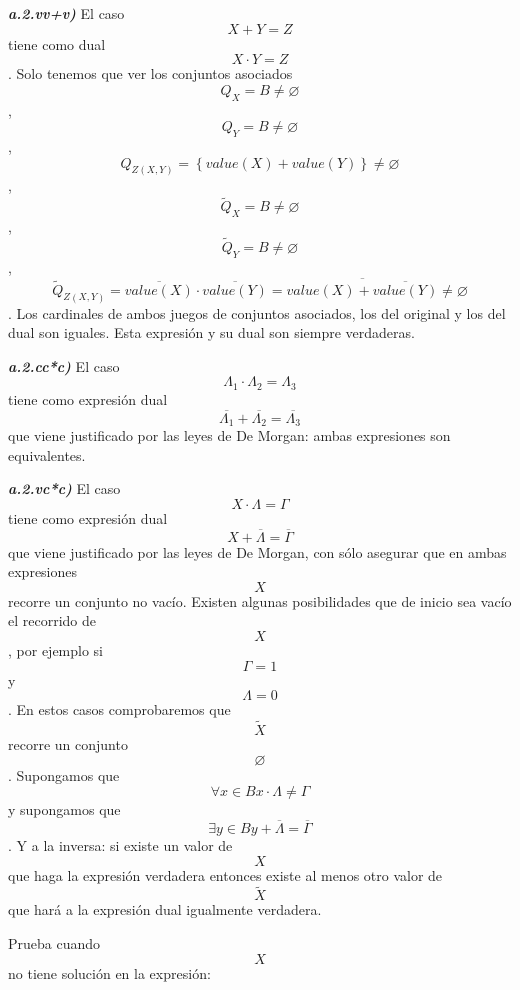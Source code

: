\begin{enumerate}
\begin{enumerate}
\begin{enumerate}
\begin{enumerate}
\begin{enumerate}
          \emph{\textbf{a.2.vv+v)}} El caso \[{X + Y} = Z\] tiene como
          dual \[{X \cdot Y} = Z\]. Solo tenemos que ver los conjuntos
          asociados \[{Q_{X} = B} \neq \varnothing\] ,
          \[{Q_{Y} = B} \neq \varnothing\] ,
          \[{Q_{Z{({X,Y})}} = \left\{ {{\mathit{value}{(X)}} + {\mathit{value}{(Y)}}} \right\}} \neq \varnothing\]
          , \[{{\widetilde{Q}}_{X} = B} \neq \varnothing\] ,
          \[{{\widetilde{Q}}_{Y} = B} \neq \varnothing\] ,
          \[{{{\widetilde{Q}}_{Z{({X,Y})}} = {\overline{\mathit{value}{(X)}} \cdot \overline{\mathit{value}{(Y)}}}} = \overline{{\mathit{value}{(X)}}+\overline{\mathit{value}{(Y)}}}} \neq \varnothing\]
          . Los cardinales de ambos jue\-gos de conjuntos asociados, los
          del original y los del dual son iguales. Esta expresión y su
          dual son siempre verdaderas.

          \emph{\textbf{a.2.cc*c)}} El caso
          \[{\Lambda_{1} \cdot \Lambda_{2}} = \Lambda_{3}\] tiene como
          expresión dual
          \[{\overline{\Lambda_{1}} + \overline{\Lambda_{2}}} = \overline{\Lambda_{3}}\]que
          viene justificado por las leyes de De Morgan: ambas
          expresiones son equivalentes.

          \emph{\textbf{a.2.vc*c)}} El caso
          \[{X \cdot \Lambda} = \Gamma\] tiene como expresión dual
          \[{X + \overline{\Lambda}} = \overline{\Gamma}\] que viene
          justificado por las leyes de De Morgan, con sólo asegurar que
          en am\-bas expresiones \[X\]recorre un conjunto no vacío.
          Existen algunas posibili\-dades que de inicio sea vacío el
          recorrido de \[X\], por ejemplo si \[\Gamma = 1\] y
          \[\Lambda = 0\]. En estos casos comprobaremos que
          \[\widetilde{X}\] recorre un conjunto \[\varnothing\].
          Supongamos que
          \[\forall{x \in B}{{x \cdot \Lambda} \neq \Gamma}\]y
          supongamos que
          \[\exists{y \in B}{{y + \overline{\Lambda}} = \overline{\Gamma}}\].
          Y a la inversa: si existe un valor de \[X\] que haga la
          expresión verdadera entonces existe al menos otro valor de
          \[\widetilde{X}\] que hará a la expresión dual igualmente
          verdadera.

          Prueba cuando \[X\] no tiene solución en la expresión:


\end{enumerate}
\end{enumerate}
\end{enumerate}
\end{enumerate}
\end{enumerate}
